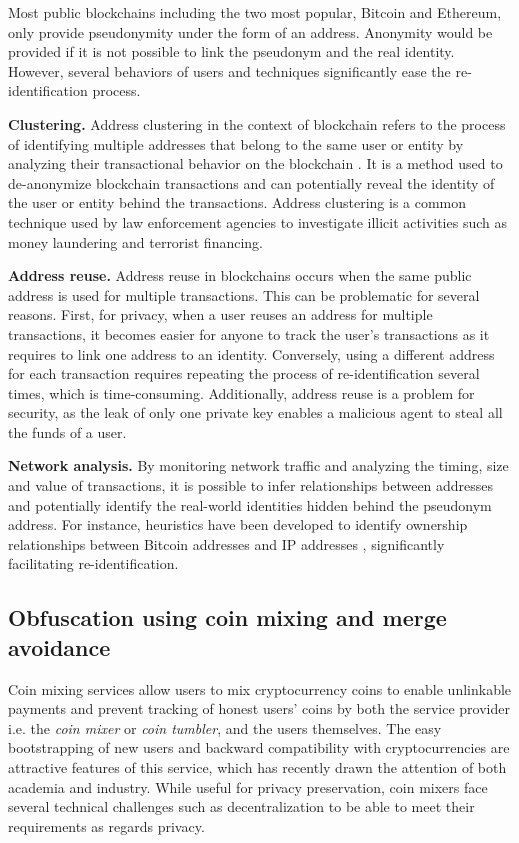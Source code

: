 Most public blockchains including the two most popular, Bitcoin and Ethereum, only provide pseudonymity under the form of an address. Anonymity would be provided if it is not possible to link the pseudonym and the real identity. However, several behaviors of users and techniques significantly ease the re-identification process.

\textbf{Clustering.} Address clustering in the context of blockchain refers to the process of identifying multiple addresses that belong to the same user or entity by analyzing their transactional behavior on the blockchain \cite{Huang2017}. It is a method used to de-anonymize blockchain transactions and can potentially reveal the identity of the user or entity behind the transactions. Address clustering is a common technique used by law enforcement \cite{Harrigan2016} agencies to investigate illicit activities such as money laundering and terrorist financing.

\textbf{Address reuse.} Address reuse in blockchains occurs when the same public address is used for multiple transactions. This can be problematic for several reasons. First, for privacy, when a user reuses an address for multiple transactions, it becomes easier for anyone to track the user's transactions as it requires to link one address to an identity. Conversely, using a different address for each transaction requires repeating the process of re-identification several times, which is time-consuming. Additionally, address reuse is a problem for security, as the leak of only one private key enables a malicious agent to steal all the funds of a user.

\textbf{Network analysis.}  By monitoring network traffic and analyzing the timing, size and value of transactions, it is possible to infer relationships between addresses and potentially identify the real-world identities hidden behind the 
pseudonym address. For instance, heuristics have been developed to identify ownership relationships between Bitcoin addresses and IP addresses \cite{Koshy2014},
significantly facilitating re-identification.

\subsection{Obfuscation using coin mixing and merge avoidance}
\label{ss_obfuscation_coin_mixing_merge_avoidance}
Coin mixing services allow users to mix cryptocurrency coins
to enable unlinkable payments and prevent tracking of honest users’ coins by both the service provider i.e. the \emph{coin mixer} or \emph{coin tumbler}, and the users themselves.
The easy bootstrapping of new users and backward
compatibility with cryptocurrencies are attractive features of this service, which
has recently drawn the attention of both academia and
industry. While useful for privacy preservation, coin mixers face several technical challenges such as decentralization to be able to meet their requirements as regards privacy.

